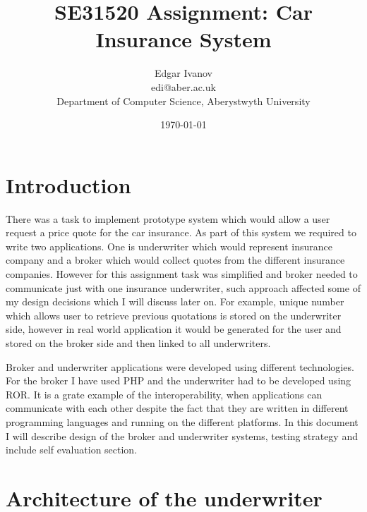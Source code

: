 \documentclass[10pt,a4paper,headinclude=true,twoside]{report}
\begin{document}
\title{SE31520 Assignment: Car Insurance System}
\author{Edgar Ivanov\\ edi@aber.ac.uk \\ Department of Computer Science, Aberystwyth University}
\date{\today}
\maketitle

\newpage
\thispagestyle{empty}
\mbox{}

\tableofcontents

\section{Introduction}
There was a task to implement prototype system which would allow a user request a price quote for the car insurance. As part of this system we required to write two applications. One is underwriter which would represent insurance company and a broker which would collect quotes from the different insurance companies. However for this assignment task was simplified and broker needed to communicate just with one insurance underwriter, such approach affected some of my design decisions which I will discuss later on. For example, unique number which allows user to retrieve previous quotations is stored on the underwriter side, however in real world application it would be generated for the user and stored on the broker side and then linked to all underwriters. 

Broker and underwriter applications were developed using different technologies. For the broker I have used PHP and the underwriter had to be developed using ROR. It is a grate example of the interoperability, when applications can communicate with each other despite the fact that they are written in different programming languages and running on the different platforms. In this document I will describe design of the broker and underwriter systems, testing strategy and include self evaluation section.  

\section{Architecture of the underwriter}
\end{document}
